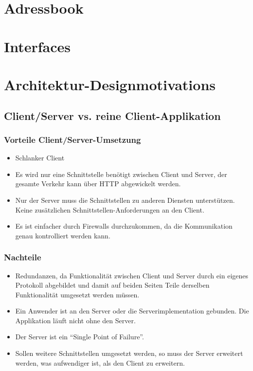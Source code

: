 \section{Adressbook}


\section{Interfaces}


\clearpage

\section{Architektur-Designmotivations}
	\subsection{Client/Server vs. reine Client-Applikation}
		\subsubsection{Vorteile Client/Server-Umsetzung}
		\begin{itemize}
			\item Schlanker Client
			\item Es wird nur eine Schnittstelle benötigt zwischen Client und Server, der gesamte Verkehr kann über HTTP abgewickelt werden.
			\item Nur der Server muss die Schnittstellen zu anderen Diensten
			unterstützen. Keine zusätzlichen Schnittstellen-Anforderungen an den Client.
			\item Es ist einfacher durch Firewalls durchzukommen, da die Kommunikation genau kontrolliert werden kann.
		\end{itemize}
		\subsubsection{Nachteile}
		\begin{itemize}
			\item Redundanzen, da Funktionalität zwischen Client und Server durch
			ein eigenes Protokoll abgebildet und damit auf beiden Seiten Teile derselben
			Funktionalität umgesetzt werden müssen.
			\item Ein Anwender ist an den Server oder die Serverimplementation gebunden.
			Die Applikation läuft nicht ohne den Server.
			\item Der Server ist ein "`Single Point of Failure"'.
			\item Sollen weitere Schnittstellen umgesetzt werden, so muss der Server
			erweitert werden, was aufwendiger ist, als den Client zu erweitern.
		\end{itemize}



